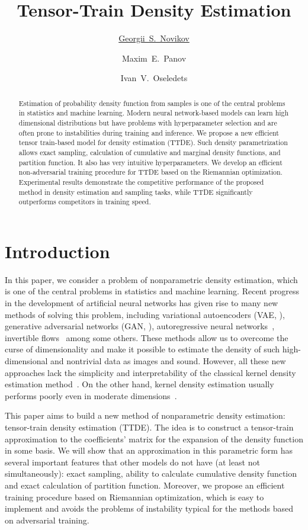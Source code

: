 \documentclass[accepted]{uai2021}
\title{Tensor-Train Density Estimation}
\author[1]{\href{mailto:Georgii Novikov <georgii.novikov@skoltech.ru>?Subject=Tensor-Train Density Estimation}{Georgii~S.~Novikov}{}} %
\author[1]{Maxim~E.~Panov}
\author[1]{Ivan~V.~Oseledets}
\affil[1]{%
  Skolkovo Institute of Science and Technology \\
  Moscow, Russia
}
\begin{document}
  \maketitle

  \begin{abstract}
    Estimation of probability density function from samples is one of the central problems in statistics and machine learning. Modern neural network-based models can learn high dimensional distributions but have problems with hyperparameter selection and are often prone to instabilities during training and inference. We propose a new efficient tensor train-based model for density estimation (TTDE). Such density parametrization allows exact sampling, calculation of cumulative and marginal density functions, and partition function. It also has very intuitive hyperparameters. We develop an efficient non-adversarial training procedure for TTDE based on the Riemannian optimization. Experimental results demonstrate the competitive performance of the proposed method in density estimation and sampling tasks, while TTDE significantly outperforms competitors in training speed.
  \end{abstract}


  \section{Introduction}
  \label{sec:introduction}
  In this paper, we consider a problem of nonparametric density estimation, which is one of the central problems in statistics and machine learning. Recent progress in the development of artificial neural networks has given rise to many new methods of solving this problem, including variational autoencoders (VAE, \cite{Kingma2013}), generative adversarial networks (GAN, \cite{goodfellow2014generative}), autoregressive neural networks~\citep{Oord2016}, invertible flows~\citep{Dinh2016} among some others. These methods allow us to overcome the curse of dimensionality and make it possible to estimate the density of such high-dimensional and nontrivial data as images and sound. However, all these new approaches lack the simplicity and interpretability of the classical kernel density estimation method~\citep{Scott1977}. On the other hand, kernel density estimation usually performs poorly even in moderate dimensions~\citep{Wang2019}.

  This paper aims to build a new method of nonparametric density estimation: tensor-train density estimation (TTDE).
  The idea is to construct a tensor-train approximation to the coefficients' matrix for the expansion of the density function in some basis.
  We will show that an approximation in this parametric form has several important features that other models do not have (at least not simultaneously): exact sampling, ability to calculate cumulative density function and exact calculation of partition function. Moreover, we propose an efficient training procedure based on Riemannian optimization, which is easy to implement and avoids the problems of instability typical for the methods based on adversarial training.
\end{document}
